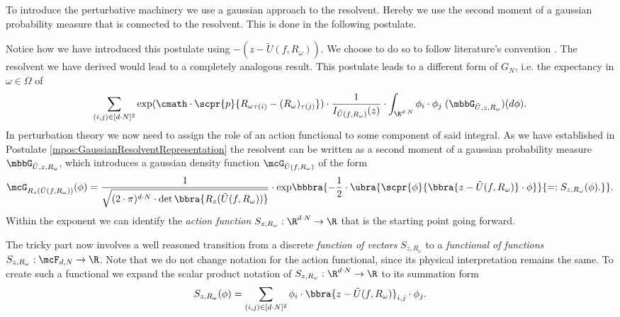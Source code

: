 To introduce the perturbative machinery we use a gaussian approach to the resolvent. Hereby we use the second moment of a gaussian probability measure that is connected to the resolvent. This is done in the following postulate.

Notice how we have introduced this postulate using $-(z-\tilde U(f,R_\omega))$. We choose to do so to follow literature's convention \cite{mth:vogel}. The resolvent we have derived would lead to a completely analogous result. This postulate leads to a different form of $G_N$, i.e. the expectancy in $\omega\in\Omega$ of
\[
    \sum_{(i,j)\in[d\cdot N]^2}\exp(\cmath\cdot\scpr{p}{{R_\omega}_{\tau(i)} - (R_\omega)_{\tau(j)}})\cdot\frac{1}{I_{\tilde U(f,R_\omega)}(z)}\cdot\int_{\R^{d\cdot N}}\phi_i\cdot\phi_j\;(\mbbG_{\tilde U, z, R_\omega})(d\phi).
\]
In perturbation theory we now need to assign the role of an action functional to some component of said integral. As we have established in Postulate \ref{mpos:GaussianResolventRepresentation} the resolvent can be written as a second moment of a gaussian probability measure $\mbbG_{\tilde U, z, R_\omega}$, which introduces a gaussian density function $\mcG_{\tilde U(f,R_\omega)}$ of the form
\begin{align}
    \mcG_{R_z(\tilde U(f,R_\omega))}(\phi) = \frac{1}{\sqrt{(2\cdot\pi)^{d\cdot N}\cdot\det\bbra{R_z(\tilde U(f,R_\omega))}}}\cdot{\exp}\bbbra{
        -\frac{1}{2}\cdot\ubra{
            \scpr{\phi}{\bbra{z - \tilde U(f,R_\omega)}\cdot\phi}
        }{
            =: S_{z,R_{\omega}}(\phi).
        }
    }. \label{eq:GeneralGN}
\end{align}
Within the exponent we can identify the \emph{action function} $S_{z,R_{\omega}}:\R^{d\cdot N}\to\R$ that is the starting point going forward.

The tricky part now involves a well reasoned transition from a discrete \emph{function of vectors} $S_{z,R_{\omega}}$ to a \emph{functional of functions} $S_{z,R_{\omega}}:\mcF_{d,N}\to\R$. Note that we do not change notation for the action functional, since its physical interpretation remains the same.
To create such a functional we expand the scalar product notation of $S_{z,R_{\omega}}:\R^{d\cdot N}\to\R$ to its summation form
\begin{align}
    S_{z,R_{\omega}}(\phi) = \sum_{(i,j)\in[d\cdot N]^2}\phi_i\cdot\bbra{z - \tilde U(f,R_\omega)}_{i,j}\cdot\phi_j.\label{eq:DiscreteActionOG}
\end{align}
